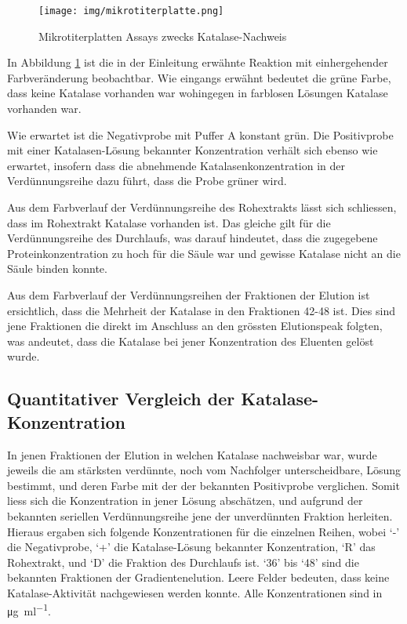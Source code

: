 \documentclass[a4paper,german]{scrreprt}
\begin{document}
\begin{figure}[h]
	\centering
	\texttt{[image: img/mikrotiterplatte.png]}
	\caption{Mikrotiterplatten Assays zwecks Katalase-Nachweis}
	\label{fig:katalase_nachweis}
\end{figure}

In Abbildung \ref{fig:katalase_nachweis} ist die in der Einleitung erwähnte
Reaktion mit einhergehender Farbveränderung beobachtbar. Wie eingangs erwähnt
bedeutet die grüne Farbe, dass keine Katalase vorhanden war wohingegen in
farblosen Lösungen Katalase vorhanden war.

Wie erwartet ist die Negativprobe mit Puffer A konstant grün. Die Positivprobe
mit einer Katalasen-Lösung bekannter Konzentration verhält sich ebenso wie
erwartet, insofern dass die abnehmende Katalasenkonzentration in der
Verdünnungsreihe dazu führt, dass die Probe grüner wird.

Aus dem Farbverlauf der Verdünnungsreihe des Rohextrakts lässt sich schliessen,
dass im Rohextrakt Katalase vorhanden ist. Das gleiche gilt für die
Verdünnungsreihe des Durchlaufs, was darauf hindeutet, dass die zugegebene
Proteinkonzentration zu hoch für die Säule war und gewisse Katalase nicht an
die Säule binden konnte.

Aus dem Farbverlauf der Verdünnungsreihen der Fraktionen der Elution ist
ersichtlich, dass die Mehrheit der Katalase in den Fraktionen 42-48 ist. Dies
sind jene Fraktionen die direkt im Anschluss an den grössten Elutionspeak
folgten, was andeutet, dass die Katalase bei jener Konzentration des Eluenten
gelöst wurde.

\subsection{Quantitativer Vergleich der Katalase-Konzentration}

In jenen Fraktionen der Elution in welchen Katalase nachweisbar war, wurde
jeweils die am stärksten verdünnte, noch vom Nachfolger unterscheidbare, Lösung
bestimmt, und deren Farbe mit der der bekannten Positivprobe verglichen.  Somit
liess sich die Konzentration in jener Lösung abschätzen, und aufgrund der
bekannten seriellen Verdünnungsreihe jene der unverdünnten Fraktion herleiten.
Hieraus ergaben sich folgende Konzentrationen für die einzelnen Reihen, wobei
`-' die Negativprobe, `+' die Katalase-Lösung bekannter Konzentration, `R' das
Rohextrakt, und `D' die Fraktion des Durchlaufs ist. `36' bis `48' sind die
bekannten Fraktionen der Gradientenelution. Leere Felder bedeuten, dass keine
Katalase-Aktivität nachgewiesen werden konnte. Alle Konzentrationen sind in
\si{\ug \per \ml}.
\\
\end{document}

